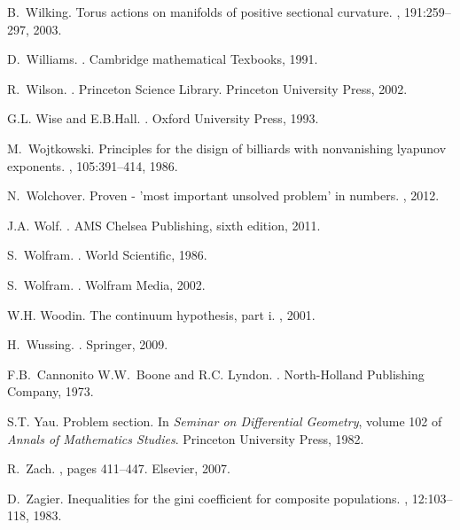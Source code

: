 \documentclass[12pt]{amsart}
\newcounter{example}    \def\example#1{ \item \fontsize{12}{15} \selectfont #1 \fontsize{12}{15} \selectfont }
\begin{document}
\begin{thebibliography}{100}
B.~Wilking.
\newblock Torus actions on manifolds of positive sectional curvature.
, 191:259--297, 2003.

D.~Williams.
.
\newblock Cambridge mathematical Texbooks, 1991.

R.~Wilson.
.
\newblock Princeton Science Library. Princeton University Press, 2002.

G.L. Wise and E.B.Hall.
.
\newblock Oxford University Press, 1993.

M.~Wojtkowski.
\newblock Principles for the disign of billiards with nonvanishing lyapunov
  exponents.
, 105:391--414, 1986.

N.~Wolchover.
\newblock Proven - 'most important unsolved problem' in numbers.
, 2012.

J.A. Wolf.
.
\newblock AMS Chelsea Publishing, sixth edition, 2011.

S.~Wolfram.
.
\newblock World Scientific, 1986.

S.~Wolfram.
.
\newblock Wolfram Media, 2002.

W.H. Woodin.
\newblock The continuum hypothesis, part i.
, 2001.

H.~Wussing.
.
\newblock Springer, 2009.

F.B.~Cannonito W.W.~Boone and R.C. Lyndon.
.
\newblock North-Holland Publishing Company, 1973.

S.T. Yau.
\newblock Problem section.
\newblock In {\em Seminar on Differential Geometry}, volume 102 of {\em Annals
  of Mathematics Studies}. Princeton University Press, 1982.

R.~Zach.
, pages 411--447.
\newblock Elsevier, 2007.

D.~Zagier.
\newblock Inequalities for the gini coefficient for composite populations.
, 12:103--118, 1983.


\end{thebibliography}
\end{document}
